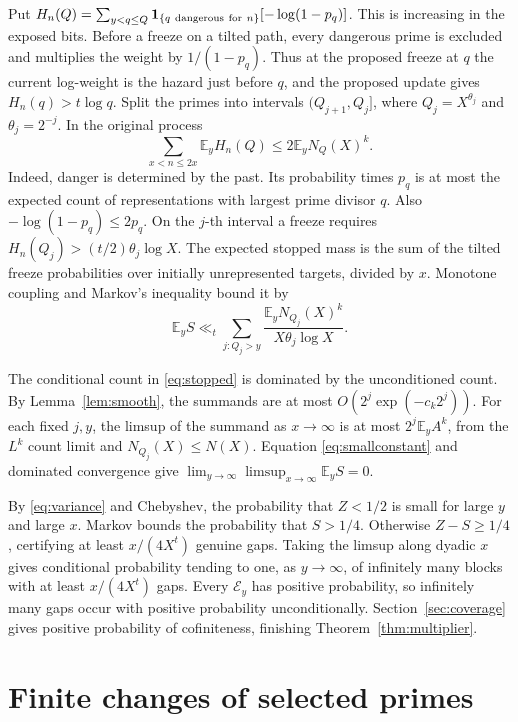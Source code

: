 \documentclass[11pt]{article}
\newcommand{\E}{\mathbb E}
\begin{document}
Put \(H_n(Q)=\sum_{y<q\le Q}\mathbf1_{\{q\ {\rm dangerous\ for}\ n\}}
[-\log(1-p_q)]\). This is increasing in the exposed bits.
Before a freeze on a tilted path, every dangerous prime is
excluded and multiplies the weight by \(1/(1-p_q)\).
Thus at the proposed freeze at \(q\) the current log-weight
is the hazard just before \(q\), and the proposed update
gives \(H_n(q)>t\log q\). Split the primes into intervals
\((Q_{j+1},Q_j]\), where \(Q_j=X^{\theta_j}\) and
\(\theta_j=2^{-j}\). In the original process
\[
     \sum_{x<n\le2x}\E_y H_n(Q)
                    \le 2\E_y N_Q(X)^k.
\]
Indeed, danger is determined by the past. Its probability times
\(p_q\) is at most the expected count of representations with
largest prime divisor \(q\). Also \(-\log(1-p_q)\le2p_q\).
On the \(j\)-th interval a freeze requires
\(H_n(Q_j)>(t/2)\theta_j\log X\). The expected stopped mass is the sum of the tilted freeze
probabilities over initially unrepresented targets, divided by
\(x\). Monotone coupling and Markov's inequality bound it by
\begin{equation}\label{eq:stopped}
       \E_y S\ll_t
       \sum_{j:Q_j>y}\frac{\E_y N_{Q_j}(X)^k}
                                {X\theta_j\log X}.
\end{equation}

The conditional count in \eqref{eq:stopped} is dominated by
the unconditioned count. By Lemma~\ref{lem:smooth}, the summands
are at most \(O(2^j\exp(-c_k2^j))\). For each fixed \(j,y\),
the limsup of the summand as \(x\to\infty\) is at most
\(2^j\E_y A^k\), from the \(L^k\) count limit and
\(N_{Q_j}(X)\le N(X)\). Equation \eqref{eq:smallconstant} and
dominated convergence give
\(\lim_{y\to\infty}\limsup_{x\to\infty}\E_y S=0\).

By \eqref{eq:variance} and Chebyshev, the probability that
\(Z<1/2\) is small for large \(y\) and large \(x\).
Markov bounds the probability that \(S>1/4\).
Otherwise \(Z-S\ge1/4\), certifying at least \(x/(4X^t)\)
genuine gaps. Taking the limsup along dyadic \(x\) gives
conditional probability tending to one, as \(y\to\infty\),
of infinitely many blocks with at least \(x/(4X^t)\) gaps.
Every \(\mathcal E_y\) has positive probability, so infinitely
many gaps occur with positive probability unconditionally.
Section~\ref{sec:coverage} gives positive probability of
cofiniteness, finishing Theorem~\ref{thm:multiplier}.

\section{Finite changes of selected primes}\label{sec:finite}
\end{document}

